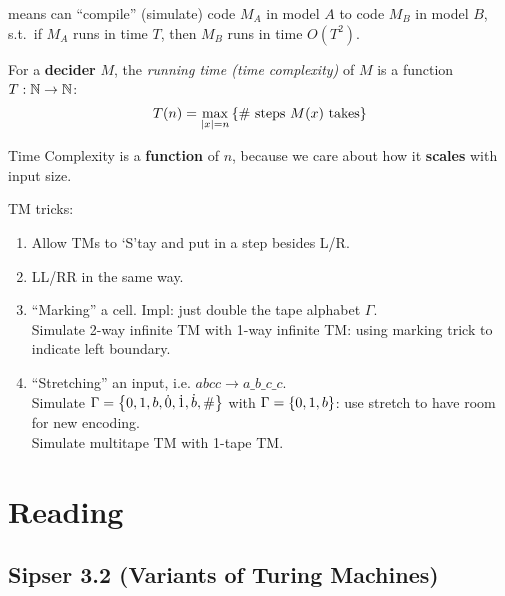 \documentclass{article}
\begin{document}
\begin{definition}
  means can ``compile'' (simulate) code \(M_A\) in model \(A\) to code \(M_B\) in model \(B\), s.t.\ if \(M_A\) runs in time \(T\), then \(M_B\) runs in time \(O(T^2)\).
\end{definition}

\begin{definition}
  For a {\bf decider} \(M\), the {\it running time (time complexity)} of \(M\) is a function \(T: \mathbb N \to \mathbb N\):
  \[ T(n) = \max_{\left\lvert x \right\rvert = n} \left\lbrace \text{\# steps \(M(x)\) takes} \right\rbrace \]
\end{definition}

\begin{remark}
  Time Complexity is a {\bf function} of \(n\), because we care about how it {\bf scales} with input size.
\end{remark}

TM tricks:
\begin{enumerate}
  \item Allow TMs to `S'tay and put in a step besides L/R.
  \item LL/RR in the same way.
  \item ``Marking'' a cell. Impl: just double the tape alphabet \(\Gamma\). \\
        Simulate 2-way infinite TM with 1-way infinite TM: using marking trick to indicate left boundary.
  \item ``Stretching'' an input, i.e. \(abcc \to a\_b\_c\_c\). \\
        Simulate \(\Gamma = \left\lbrace 0, 1, b, \dot{0}, \dot{1}, \dot{b}, \# \right\rbrace\) with \(\Gamma = \left\lbrace 0, 1, b \right\rbrace\): use stretch to have room for new encoding. \\
        Simulate multitape TM with 1-tape TM.
\end{enumerate}

\section{Reading}

\subsection{Sipser 3.2 (Variants of Turing Machines)}
\end{document}

